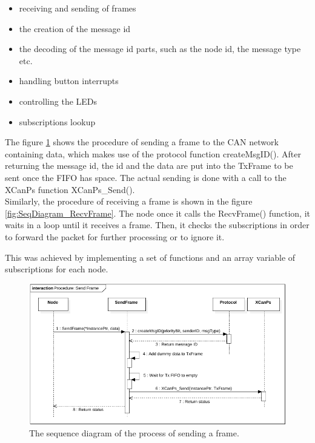 \begin{itemize}
\item receiving and sending of frames
\item the creation of the message id
\item the decoding of the message id parts, such as the node id, the message type etc. 
\item handling button interrupts
\item controlling the LEDs
\item subscriptions lookup
\end{itemize}
The figure \ref{fig:SeqDiagram_SendFrame} shows the procedure of sending a frame to the CAN network containing data, which makes use of the protocol function createMsgID().
After returning the message id, the id and the data are put into the TxFrame to be sent once the FIFO has space.
The actual sending is done with a call to the XCanPs function XCanPs\_Send().
\\
Similarly, the procedure of receiving a frame is shown in the figure \ref{fig:SeqDiagram_RecvFrame}.
The node once it calls the RecvFrame() function, it waits in a loop until it receives a frame. Then, it checks the subscriptions in order to forward the packet for further processing or to ignore it.


This was achieved by implementing a set of functions and an array variable of subscriptions for each node.

\begin{figure}[h!]
	\centering
	\includegraphics[width = 1.1\linewidth]{graphics/SeqDiagram_SendFrame.pdf}
	\caption{The sequence diagram of the process of sending a frame.}
	\label{fig:SeqDiagram_SendFrame}
\end{figure}

